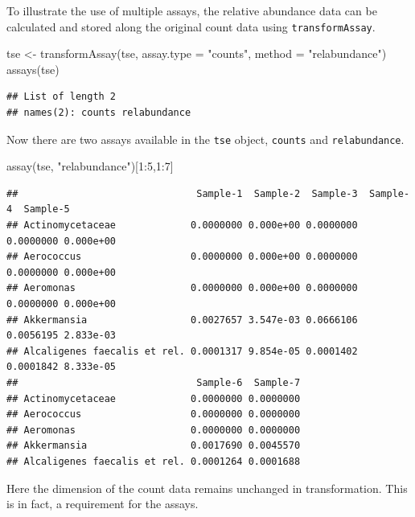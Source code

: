 \documentclass[
]{book}
\newenvironment{Shaded}{\begin{snugshade}}{\end{snugshade}}
\newcommand{\AttributeTok}[1]{\textcolor[rgb]{0.77,0.63,0.00}{#1}}
\newcommand{\DecValTok}[1]{\textcolor[rgb]{0.00,0.00,0.81}{#1}}
\newcommand{\FunctionTok}[1]{\textcolor[rgb]{0.00,0.00,0.00}{#1}}
\newcommand{\NormalTok}[1]{#1}
\newcommand{\OtherTok}[1]{\textcolor[rgb]{0.56,0.35,0.01}{#1}}
\newcommand{\SpecialCharTok}[1]{\textcolor[rgb]{0.00,0.00,0.00}{#1}}
\newcommand{\StringTok}[1]{\textcolor[rgb]{0.31,0.60,0.02}{#1}}
\begin{document}
To illustrate the use of multiple assays, the relative abundance data can be
calculated and stored along the original count data using \texttt{transformAssay}.

\begin{Shaded}
\begin{Highlighting}[]
\NormalTok{tse }\OtherTok{\textless{}{-}} \FunctionTok{transformAssay}\NormalTok{(tse, }\AttributeTok{assay.type =} \StringTok{"counts"}\NormalTok{, }\AttributeTok{method =} \StringTok{"relabundance"}\NormalTok{)}
\FunctionTok{assays}\NormalTok{(tse)}
\end{Highlighting}
\end{Shaded}

\begin{verbatim}
## List of length 2
## names(2): counts relabundance
\end{verbatim}

Now there are two assays available in the \texttt{tse} object, \texttt{counts} and
\texttt{relabundance}.

\begin{Shaded}
\begin{Highlighting}[]
\FunctionTok{assay}\NormalTok{(tse, }\StringTok{"relabundance"}\NormalTok{)[}\DecValTok{1}\SpecialCharTok{:}\DecValTok{5}\NormalTok{,}\DecValTok{1}\SpecialCharTok{:}\DecValTok{7}\NormalTok{]}
\end{Highlighting}
\end{Shaded}

\begin{verbatim}
##                               Sample-1  Sample-2  Sample-3  Sample-4  Sample-5
## Actinomycetaceae             0.0000000 0.000e+00 0.0000000 0.0000000 0.000e+00
## Aerococcus                   0.0000000 0.000e+00 0.0000000 0.0000000 0.000e+00
## Aeromonas                    0.0000000 0.000e+00 0.0000000 0.0000000 0.000e+00
## Akkermansia                  0.0027657 3.547e-03 0.0666106 0.0056195 2.833e-03
## Alcaligenes faecalis et rel. 0.0001317 9.854e-05 0.0001402 0.0001842 8.333e-05
##                               Sample-6  Sample-7
## Actinomycetaceae             0.0000000 0.0000000
## Aerococcus                   0.0000000 0.0000000
## Aeromonas                    0.0000000 0.0000000
## Akkermansia                  0.0017690 0.0045570
## Alcaligenes faecalis et rel. 0.0001264 0.0001688
\end{verbatim}

Here the dimension of the count data remains unchanged in
transformation. This is in fact, a requirement for the assays.
\end{document}

